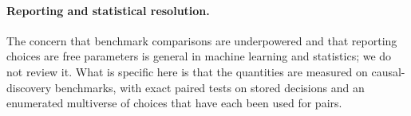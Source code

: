 \paragraph{Reporting and statistical resolution.} The concern that benchmark comparisons are underpowered and that reporting choices are free parameters is general in machine learning and statistics; we do not review it. What is specific here is that the quantities are measured on causal-discovery benchmarks, with exact paired tests on stored decisions and an enumerated multiverse of choices that have each been used for pairs.
